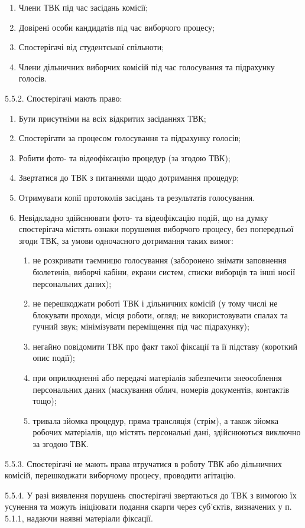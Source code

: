         \begin{enumerate}[label=\alph*)]
            \item Члени ТВК під час засідань комісії;
            \item Довірені особи кандидатів під час виборчого процесу;
            \item Спостерігачі від студентської спільноти;
            \item Члени дільничних виборчих комісій під час голосування та підрахунку голосів.
        \end{enumerate}

    5.5.2. Спостерігачі мають право:

        \begin{enumerate}[label=\alph*)]
            \item Бути присутніми на всіх відкритих засіданнях ТВК;
            \item Спостерігати за процесом голосування та підрахунку голосів;
            \item Робити фото- та відеофіксацію процедур (за згодою ТВК);
            \item Звертатися до ТВК з питаннями щодо дотримання процедур;
            \item Отримувати копії протоколів засідань та результатів голосування.
            \item Невідкладно здійснювати фото- та відеофіксацію подій, що на думку спостерігача містять ознаки порушення виборчого процесу, без попередньої згоди ТВК, за умови одночасного дотримання таких вимог:
                \begin{enumerate}[label=\roman*)]
                    \item не розкривати таємницю голосування (заборонено знімати заповнення бюлетенів, виборчі кабіни, екрани систем, списки виборців та інші носії персональних даних);
                    \item не перешкоджати роботі ТВК і дільничних комісій (у тому числі не блокувати проходи, місця роботи, огляд; не використовувати спалах та гучний звук; мінімізувати переміщення під час підрахунку);
                    \item негайно повідомити ТВК про факт такої фіксації та її підставу (короткий опис події);
                    \item при оприлюдненні або передачі матеріалів забезпечити знеособлення персональних даних (маскування облич, номерів документів, контактів тощо);
                    \item тривала зйомка процедур, пряма трансляція (стрім), а також зйомка робочих матеріалів, що містять персональні дані, здійснюються виключно за згодою ТВК.
                \end{enumerate}
        \end{enumerate}

    5.5.3. Спостерігачі не мають права втручатися в роботу ТВК або дільничних комісій, перешкоджати виборчому процесу, проводити агітацію.

    5.5.4. У разі виявлення порушень спостерігачі звертаються до ТВК з вимогою їх усунення та можуть ініціювати подання скарги через суб’єктів, визначених у п. 5.1.1, надаючи наявні матеріали фіксації.
